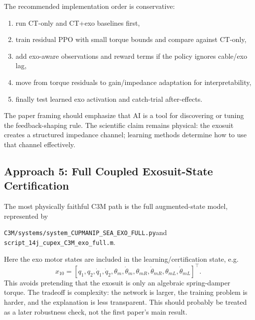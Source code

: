 \documentclass[11pt]{article}
\begin{document}
The recommended implementation order is conservative:
\begin{enumerate}[leftmargin=1.5em]
    \item run CT-only and CT+exo baselines first,
    \item train residual PPO with small torque bounds and compare against CT-only,
    \item add exo-aware observations and reward terms if the policy ignores cable/exo lag,
    \item move from torque residuals to gain/impedance adaptation for interpretability,
    \item finally test learned exo activation and catch-trial after-effects.
\end{enumerate}
The paper framing should emphasize that AI is a tool for discovering or tuning the feedback-shaping rule.  The scientific claim remains physical: the exosuit creates a structured impedance channel; learning methods determine how to use that channel effectively.

\subsection{Approach 5: Full Coupled Exosuit-State Certification}
The most physically faithful C3M path is the full augmented-state model, represented by
\begin{center}
\small\texttt{C3M/systems/system\_CUPMANIP\_SEA\_EXO\_FULL.py}\quad and\quad
\small\texttt{script\_14j\_cupex\_C3M\_exo\_full.m}.
\end{center}
Here the exo motor states are included in the learning/certification state, e.g.
\begin{equation}
    x_{10} = [q_1,q_2,\dot{q}_1,\dot{q}_2,\theta_m,\dot{\theta}_m,
              \theta_{mR},\dot{\theta}_{mR},\theta_{mL},\dot{\theta}_{mL}]^\top .
\end{equation}
This avoids pretending that the exosuit is only an algebraic spring-damper torque.  The tradeoff is complexity: the network is larger, the training problem is harder, and the explanation is less transparent.  This should probably be treated as a later robustness check, not the first paper's main result.
\end{document}
